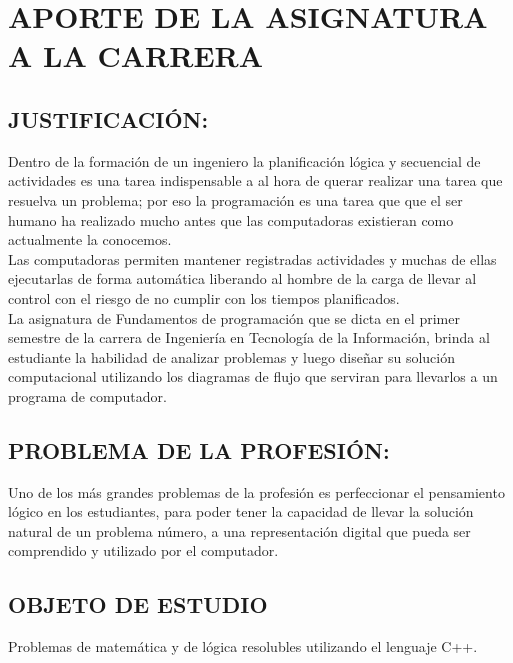 \documentclass[a4paper,12pt,spanish]{article}
\begin{document}
\section{APORTE DE LA ASIGNATURA A LA CARRERA}
\label{sec:aporte-de-la}



\subsection{JUSTIFICACIÓN:}

Dentro de la formación de un ingeniero la planificación lógica y secuencial de actividades es una tarea indispensable a al hora de querar realizar una tarea que resuelva un problema; por eso la programación es una tarea que que el ser humano ha realizado mucho antes que las computadoras existieran como actualmente la conocemos.\\


Las computadoras permiten mantener registradas actividades y muchas de ellas ejecutarlas de forma automática liberando al hombre de la carga de llevar al control con el riesgo de no cumplir con los tiempos planificados.\\




La asignatura de Fundamentos de programación que se dicta en el primer semestre de la carrera de Ingeniería en Tecnología de la Información, brinda al estudiante la habilidad de analizar problemas y luego diseñar su solución computacional utilizando los diagramas de flujo que serviran para llevarlos a un programa de computador.




\subsection{PROBLEMA DE LA PROFESIÓN:}


Uno de los más grandes problemas de la profesión es perfeccionar el pensamiento lógico en los estudiantes, para poder tener la capacidad de llevar la solución natural  de un problema número,  a una representación digital que pueda ser comprendido y utilizado por el computador.


\subsection{OBJETO DE ESTUDIO}
Problemas de matemática y de lógica resolubles utilizando el lenguaje  C++.

\newpage
\end{document}
